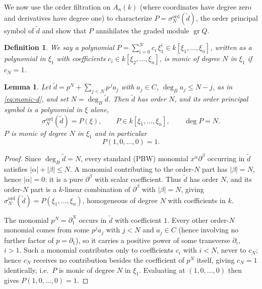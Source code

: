 \documentclass[pdflatex,sn-mathphys-num]{sn-jnl}
\numberwithin{equation}{section}
\theoremstyle{thmstyleone}
\newtheorem{lemma}[theorem]{Lemma}
\newtheorem{definition}[theorem]{Definition}
\theoremstyle{thmstyletwo}
\newcommand{\gr}{\operatorname{gr}}
\begin{document}
We now use the order filtration on $A_n(k)$ (where coordinates have
degree zero and derivatives have degree one) to characterize $P =
\sigma^{\mathrm{ord}}_N(\tilde d)$, the order principal symbol of $\tilde
d$ and show that $P$ annihilates the graded module $\gr Q$. 

\begin{definition}\label{def:monic-xi1}
We say a polynomial $P=\sum_{i=0}^Nc_i\,\xi_1^i\in
k[\xi_1,\ldots,\xi_n]$, written as a polynomial in $\xi_1$ with
coefficients $c_i \in k[\xi_2,\ldots,\xi_n]$, is \emph{monic of degree $N$ in
$\xi_1$} if $c_N=1$.
\end{definition}

\begin{lemma}\label{lem:order-symbol}
Let $\tilde d=p^N+\sum_{j<N}p^{\,j}a_j$ with $a_j\in C$, $\deg_Ba_j\le N-j$,
as in \eqref{eq:monic-d}, and set $N=\deg_B\tilde d$. Then $\tilde d$ has
order $N$, and its order principal symbol is a polynomial in $\xi$ alone,
\begin{equation} \sigma_N^{\mathrm{ord}}(\tilde d)=P(\xi),\qquad
 P\in k[\xi_1,\ldots,\xi_n],\qquad \deg P=N.
 \label{eq:P}\end{equation}
$P$ is monic of degree $N$ in $\xi_1$ and in particular
\begin{equation} P(1,0,\ldots,0)=1.
 \label{eq:P-e1}\end{equation}
\end{lemma}

\begin{proof}
Since $\deg_B\tilde d=N$, every standard (PBW) monomial $x^\alpha\partial^\beta$
occurring in $\tilde d$ satisfies $|\alpha|+|\beta|\le N$. A monomial
contributing to the order-$N$ part has $|\beta|=N$, hence $|\alpha|=0$: it
is a pure $\partial^\beta$ with scalar coefficient. Thus $\tilde d$ has
order $N$, and its order-$N$ part is a $k$-linear combination of
$\partial^\beta$ with $|\beta|=N$, giving $\sigma^{\mathrm{ord}}_N(\tilde
d)=P(\xi_1, \dots, \xi_n)$, homogeneous of degree $N$ with coefficients in $k$.

The monomial $p^N=\partial_1^N$ occurs in $\tilde d$ with coefficient $1$.
Every other order-$N$ monomial comes from some $p^ja_j$ with $j<N$ and
$a_j\in C$ (hence involving no further factor of $p=\partial_1$), so it
carries a positive power of some transverse $\partial_i$, $i>1$. Such a
monomial contributes only to coefficients $c_i$ with $i<N$, never to
$c_N$; hence $c_N$ receives no contribution besides the coefficient of
$p^N$ itself, giving $c_N=1$ identically, i.e.\ $P$ is monic of degree $N$
in $\xi_1$. Evaluating at $(1,0,\ldots,0)$ then gives $P(1,0,\ldots,0)=1$.
\end{proof}
\end{document}
